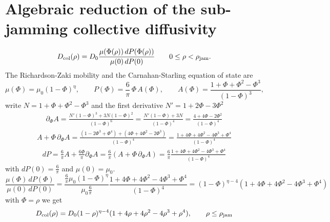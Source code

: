 \documentclass[11pt,a4paper]{report}
\begin{document}
	\section{Algebraic reduction of the sub-jamming collective diffusivity}
	\label{subsec:Dcol_derivation}
	\begin{equation}
		{
			D_{\rm col}(\rho)
			=
			D_0
			\frac{\mu(\Phi(\rho))\,dP(\Phi(\rho))}
			{\mu(0)\,dP(0)}
		}
		\qquad 0\le \rho<\rho_{\rm jam}.
	\end{equation}
	The Richardson-Zaki mobility and the Carnahan-Starling
	equation of state \cite{carnahan} \cite{zaki} \cite{Karita} \cite{slepukhin} are
	\begin{equation}
		\mu(\Phi)=\mu_0(1-\Phi)^{\eta},
		\qquad
		P(\Phi)=\frac{6}{\pi}\,\Phi\,A(\Phi),
		\qquad
		A(\Phi)=\frac{1+\Phi+\Phi^2-\Phi^3}{(1-\Phi)^3},
	\end{equation}
	write $N=1+\Phi+\Phi^2-\Phi^3$ and the first derivative $N'=1+2\Phi-3\Phi^2$
	\begin{align}
		\partial_\Phi A
		=\frac{N'(1-\Phi)^3+3N(1-\Phi)^2}{(1-\Phi)^6}
		=\frac{N'(1-\Phi)+3N}{(1-\Phi)^4}
		=\frac{4+4\Phi-2\Phi^2}{(1-\Phi)^4}
	\end{align}
	\begin{align}
		A+\Phi\,\partial_\Phi A
		=\frac{(1-2\Phi^3+\Phi^4)+(4\Phi+4\Phi^2-2\Phi^3)}{(1-\Phi)^4}
		=\frac{1+4\Phi+4\Phi^2-4\Phi^3+\Phi^4}{(1-\Phi)^4}
	\end{align}
	\begin{align}
		dP=\frac{6}{\pi}A+\frac{6\Phi}{\pi}\partial_\Phi A
		=\frac{6}{\pi}(A+\Phi\,\partial_\Phi A)
		=\frac{6}{\pi}\frac{1+4\Phi+4\Phi^2-4\Phi^3+\Phi^4}{(1-\Phi)^4}
	\end{align}
	with $dP(0)=\frac{6}{\pi}$ and $\mu(0)=\mu_0$.
	\begin{equation}
		\frac{\mu(\Phi)\,dP(\Phi)}{\mu(0)\,dP(0)}
		=
		\frac{\frac{6}{\pi}\mu_0(1-\Phi)^{\eta}}{\mu_0\frac{6}{\pi}}\frac{1+4\Phi+4\Phi^2-4\Phi^3+\Phi^4}{(1-\Phi)^4}
		=
		(1-\Phi)^{\eta-4}(1+4\Phi+4\Phi^2-4\Phi^3+\Phi^4)
	\end{equation}
	with $\Phi=\rho$ we get
	\begin{equation}
		{D_{\rm col}(\rho)
			=
			D_0(1-\rho)^{\eta-4}
			(1+4\rho+4\rho^2-4\rho^3+\rho^4),
			\qquad \rho\le\rho_{\rm jam}
		}
	\end{equation}
\end{document}
